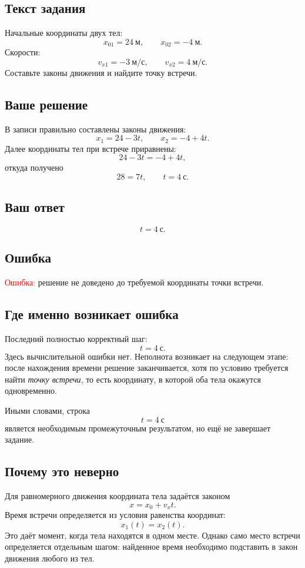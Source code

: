 \documentclass[12pt,a4paper]{article}
\begin{document}
\subsection*{Текст задания}
Начальные координаты двух тел:
\[
x_{01}=24\ \text{м},\qquad x_{02}=-4\ \text{м}.
\]
Скорости:
\[
v_{x1}=-3\ \text{м/с},\qquad v_{x2}=4\ \text{м/с}.
\]
Составьте законы движения и найдите точку встречи.

\subsection*{Ваше решение}
В записи правильно составлены законы движения:
\[
x_1=24-3t,
\qquad
x_2=-4+4t.
\]
Далее координаты тел при встрече приравнены:
\[
24-3t=-4+4t,
\]
откуда получено
\[
28=7t,
\qquad
 t=4\ \text{с}.
\]

\subsection*{Ваш ответ}
\[
t=4\ \text{с}.
\]

\subsection*{Ошибка}
\textcolor{red}{Ошибка:} решение не доведено до требуемой координаты точки встречи.

\subsection*{Где именно возникает ошибка}
Последний полностью корректный шаг:
\[
t=4\ \text{с}.
\]
Здесь вычислительной ошибки нет. Неполнота возникает на следующем этапе: после нахождения времени решение заканчивается, хотя по условию требуется найти \emph{точку встречи}, то есть координату, в которой оба тела окажутся одновременно.

Иными словами, строка
\[
\boxed{t=4\ \text{с}}
\]
является необходимым промежуточным результатом, но ещё не завершает задание.

\subsection*{Почему это неверно}
Для равномерного движения координата тела задаётся законом
\[
x=x_0+v_xt.
\]
Время встречи определяется из условия равенства координат:
\[
x_1(t)=x_2(t).
\]
Это даёт момент, когда тела находятся в одном месте. Однако само место встречи определяется отдельным шагом: найденное время необходимо подставить в закон движения любого из тел.
\end{document}
